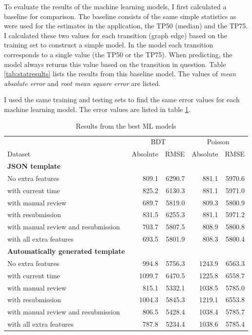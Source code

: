 To evaluate the results of the machine learning models, I first calculated a baseline for comparison.
The baseline consists of the same simple statistics as were used for the estimates in the application, the TP50 (median) and the TP75.
I calculated these two values for each transition (graph edge) based on the training set to construct a simple model. 
In the model each transition corresponds to a single value (the TP50 or the TP75). 
When predicting, the model always returns this value based on the transition in question.
Table \ref{tab:statresults} lists the results from this baseline model. 
The values of \textit{mean absolute error} and \textit{root mean square error} are listed.

I used the same training and testing sets to find the same error values for each machine learning model.
The error values are listed in table \ref{tab:mlresults}.


\begin{table}[htb]
\begin{center}
\begin{tabularx}{\linewidth}{| X | r | r | r | r |}
\hline
~ & \multicolumn{2}{c|}{BDT} & \multicolumn{2}{c|}{Poisson} \\
Dataset & Absolute & RMSE & Absolute & RMSE \\
\hline
\textbf{JSON template} &  &  &  &  \\
No extra features                   & 809.1 & 6290.7 & 881.1 & 5970.6 \\
with current time                   & 825.2 & 6130.3 & 881.1 & 5971.0 \\
with manual review                  & 689.7 & 5819.0 & 809.3 & 5800.9 \\
with resubmission                   & 831.5 & 6255.3 & 881.1 & 5971.2 \\
with manual review and resubmission & 703.7 & 5807.5 & 808.9 & 5800.8 \\
with all extra features             & 693.5 & 5801.9 & 808.3 & 5800.4 \\
\hline
\textbf{Automatically generated template} &  &  &  &  \\
No extra features                   & 994.8 & 5756.3 & 1243.9 & 6563.3 \\
with current time                   & 1099.7 & 6470.5 & 1225.8 & 6558.7 \\
with manual review                  & 815.1 & 5332.1 & 1038.5 & 5785.0 \\
with resubmission                   & 1004.3 & 5845.3 & 1219.1 & 6553.8 \\
with manual review and resubmission & 806.5 & 5428.4 & 1038.4 & 5785.7 \\
with all extra features             & 787.8 & 5234.4 & 1038.6 & 5785.4 \\
\hline
\end{tabularx}
\end{center}
\caption{Results from the best ML models}
\label{tab:mlresults}
\end{table}

